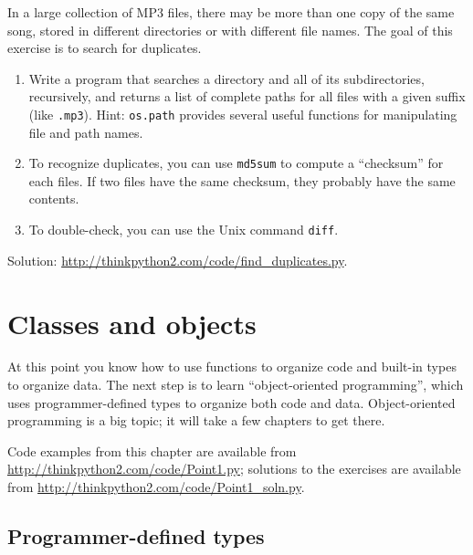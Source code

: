 \documentclass[10pt]{book}
\begin{document}
\begin{exercise}
\label{checksum}

In a large collection of MP3 files, there may be more than one
copy of the same song, stored in different directories or with
different file names.  The goal of this exercise is to search for
duplicates.

\begin{enumerate}

\item Write a program that searches a directory and all of its
subdirectories, recursively, and returns a list of complete paths
for all files with a given suffix (like {\tt .mp3}).
Hint: {\tt os.path} provides several useful functions for
manipulating file and path names.

\item To recognize duplicates, you can use {\tt md5sum}
to compute a ``checksum'' for each files.  If two files have
the same checksum, they probably have the same contents.

\item To double-check, you can use the Unix command {\tt diff}.

\end{enumerate}

Solution: \url{http://thinkpython2.com/code/find_duplicates.py}.

\end{exercise}



\chapter{Classes and objects}
\label{clobjects}

At this point you know how to use
functions to organize code and
built-in types to organize data.  The next step is to learn
``object-oriented programming'', which uses programmer-defined types
to organize both code and data.  Object-oriented programming is
a big topic; it will take a few chapters to get there.

Code examples from this chapter are available from
\url{http://thinkpython2.com/code/Point1.py}; solutions
to the exercises are available from
\url{http://thinkpython2.com/code/Point1_soln.py}.


\section{Programmer-defined types}
\label{point}
\end{document}
